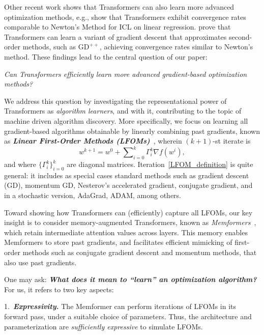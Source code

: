 \documentclass[11pt]{article}
\theoremstyle{plain}
\theoremstyle{definition}
\theoremstyle{remark}
\newcommand{\bemph}[1]{\textbf{\emph{#1}}}
\numberwithin{equation}{section}
\begin{document}
Other recent work shows that Transformers can also learn more advanced optimization methods, e.g.,  \citet{fu2023transformers} show that Transformers exhibit convergence rates comparable to Newton's Method for ICL on linear regression. \citet{vladymyrov2024linear} prove that Transformers can learn a variant of gradient descent that approximates second-order methods, such as \(\mathrm{GD}^{++}\), achieving convergence rates similar to Newton's method. These findings lead to the central question of our paper:
\begin{center}
    \emph{Can Transformers efficiently learn more advanced gradient-based optimization methods?}
\end{center}
We address this question by investigating the representational power of Transformers as \emph{algorithm learners}, and with it, contributing to the topic of machine driven algorithm discovery. More specifically, we focus on learning all gradient-based algorithms obtainable by linearly combining past gradients, known as \bemph{Linear First-Order Methods (LFOMs)}~\citep{goh2017why}, wherein \((k+1)\)-st iterate is
\begin{equation}
w^{k+1} = w^0 + \sum\nolimits_{i=0}^k \Gamma_i^k \nabla f(w^i),
\label{LFOM_definition}
\end{equation}
and where \(\{\Gamma_i^k\}_{i=0}^k\) are diagonal matrices. Iteration~\eqref{LFOM_definition} is quite general: it includes as special cases standard methods such as gradient descent (GD), momentum GD, Nesterov's accelerated gradient, conjugate gradient, and in a stochastic version, AdaGrad, ADAM, among others.

Toward showing how Transformers can (efficiently) capture all LFOMs, our key insight is to consider memory-augmented Transformers, known as \emph{Memformers}~\citep{wu2020Memformer, xu2021transformer}, which retain intermediate attention values across layers. This memory enables Memformers to store past gradients, and facilitates efficient mimicking of first-order methods such as conjugate gradient descent and momentum methods, that also use past gradients.

One may ask: \bemph{What does it mean to ``learn'' an optimization algorithm?} For us, it refers to two key aspects: 

1.~\bemph{Expressivity.} The Memformer can perform iterations of LFOMs in its forward pass, under a suitable choice of parameters. Thus, the architecture and parameterization are \emph{sufficiently expressive} to simulate LFOMs.
\end{document}
